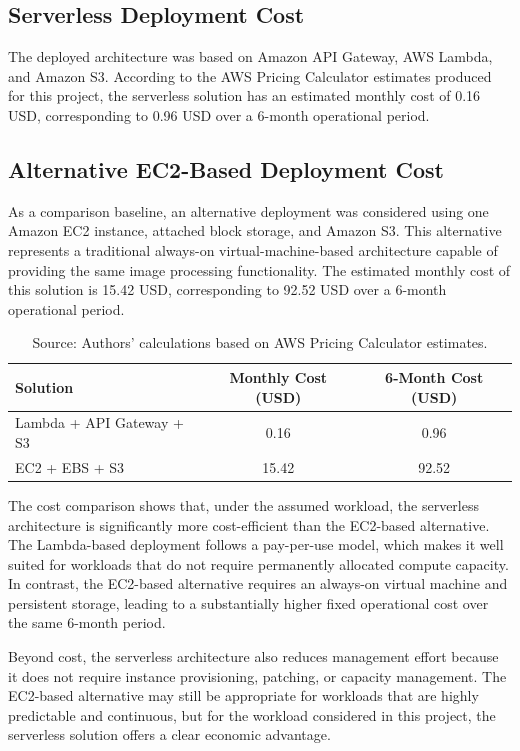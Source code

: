 \documentclass[11pt,a4paper,twocolumn]{article}
\begin{document}
\subsection{Serverless Deployment Cost}

The deployed architecture was based on Amazon API Gateway, AWS Lambda, and Amazon S3. According to the AWS Pricing Calculator estimates produced for this project, the serverless solution has an estimated monthly cost of 0.16 USD, corresponding to 0.96 USD over a 6-month operational period.

\subsection{Alternative EC2-Based Deployment Cost}

As a comparison baseline, an alternative deployment was considered using one Amazon EC2 instance, attached block storage, and Amazon S3. This alternative represents a traditional always-on virtual-machine-based architecture capable of providing the same image processing functionality. The estimated monthly cost of this solution is 15.42 USD, corresponding to 92.52 USD over a 6-month operational period.

\begin{table}[t]
\centering
\caption{Estimated 6-Month Cost Comparison}
\caption*{\footnotesize Source: Authors' calculations based on AWS Pricing Calculator estimates.}
\label{tab:costcomparison}
\begin{tabular}{lcc}
\toprule
Solution & Monthly Cost (USD) & 6-Month Cost (USD) \\
\midrule
Lambda + API Gateway + S3 & 0.16 & 0.96 \\
EC2 + EBS + S3 & 15.42 & 92.52 \\
\bottomrule
\end{tabular}
\end{table}


The cost comparison shows that, under the assumed workload, the serverless architecture is significantly more cost-efficient than the EC2-based alternative. The Lambda-based deployment follows a pay-per-use model, which makes it well suited for workloads that do not require permanently allocated compute capacity. In contrast, the EC2-based alternative requires an always-on virtual machine and persistent storage, leading to a substantially higher fixed operational cost over the same 6-month period.

Beyond cost, the serverless architecture also reduces management effort because it does not require instance provisioning, patching, or capacity management. The EC2-based alternative may still be appropriate for workloads that are highly predictable and continuous, but for the workload considered in this project, the serverless solution offers a clear economic advantage.
\end{document}
